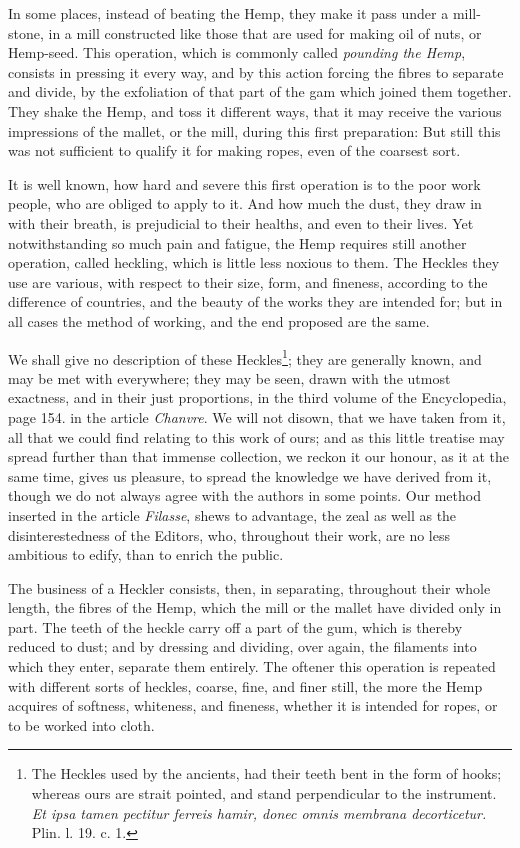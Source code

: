 \documentclass[a4paper, 11pt, oneside, polutonikogreek, english]{article}
\begin{document}
In some places, instead of beating the Hemp, they make it pass under a mill-stone, in a mill constructed like those that are used for making oil of nuts, or Hemp-seed. This operation, which is commonly called \emph{pounding the Hemp}, consists in pressing it every way, and by this action forcing the fibres to separate and divide, by the exfoliation of that part of the gam which joined them together. They shake the Hemp, and toss it different ways, that it may receive the various impressions of the mallet, or the mill, during this first preparation: But still this was not sufficient to qualify it for making ropes, even of the coarsest sort.

It is well known, how hard and severe this first operation is to the poor work people, who are obliged to apply to it. And how much the dust, they draw in with their breath, is prejudicial to their healths, and even to their lives. Yet notwithstanding so much pain and fatigue, the Hemp requires still another operation, called heckling, which is little less noxious to them. The Heckles they use are various, with respect to their size, form, and fineness, according to the difference of countries, and the beauty of the works they are intended for; but in all cases the method of working, and the end proposed are the same.

We shall give no description of these Heckles\footnote{The Heckles used by the ancients, had their teeth bent in the form of hooks; whereas ours are strait pointed, and stand perpendicular to the instrument. \emph{Et ipsa tamen pectitur ferreis hamir, donec omnis membrana decorticetur.} Plin. l. 19. c. 1.}; they are generally known, and may be met with everywhere; they may be seen, drawn with the utmost exactness, and in their just proportions, in the third volume of the Encyclopedia, page 154. in the article \emph{Chanvre}. We will not disown, that we have taken from it, all that we could find relating to this work of ours; and as this little treatise may spread further than that immense collection, we reckon it our honour, as it at the same time, gives us pleasure, to spread the knowledge we have derived from it, though we do not always agree with the authors in some points. Our method inserted in the article \emph{Filasse}, shews to advantage, the zeal as well as the disinterestedness of the Editors, who, throughout their work, are no less ambitious to edify, than to enrich the public.

The business of a Heckler consists, then, in separating, throughout their whole length, the fibres of the Hemp, which the mill or the mallet have divided only in part. The teeth of the heckle carry off a part of the gum, which is thereby reduced to dust; and by dressing and dividing, over again, the filaments into which they enter, separate them entirely. The oftener this operation is repeated with different sorts of heckles, coarse, fine, and finer still, the more the Hemp acquires of softness, whiteness, and fineness, whether it is intended for ropes, or to be worked into cloth.
\end{document}
